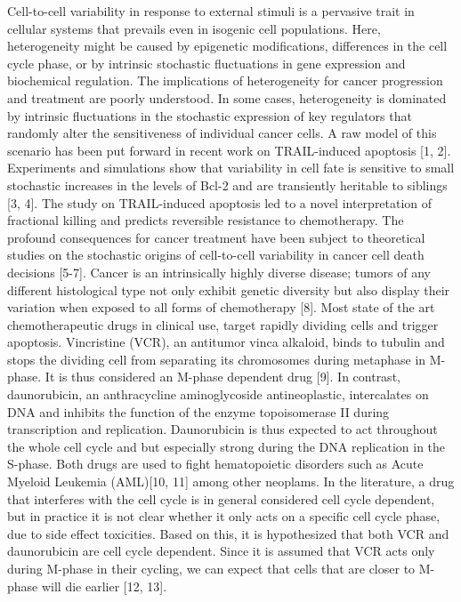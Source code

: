 \documentclass[pdftex,12pt,a4paper]{report}
\begin{document}
Cell-to-cell variability in response to external stimuli is a pervasive trait in cellular systems that prevails even in isogenic cell populations. Here, heterogeneity might be caused by epigenetic modifications, differences in the cell cycle phase, or by intrinsic stochastic fluctuations in gene expression and biochemical regulation. The implications of heterogeneity for cancer progression and treatment are poorly understood. In some cases, heterogeneity is dominated by intrinsic fluctuations in the stochastic expression of key regulators that randomly alter the sensitiveness of individual cancer cells. A raw model of this scenario has been put forward in recent work on TRAIL-induced apoptosis [1, 2]. Experiments and simulations show that variability in cell fate is sensitive to small stochastic increases in the levels of Bcl-2 and are transiently heritable to siblings [3, 4]. The study on TRAIL-induced apoptosis led to a novel interpretation of fractional killing and predicts reversible resistance to chemotherapy. The profound consequences for cancer treatment have been subject to theoretical studies on the stochastic origins of cell-to-cell variability in cancer cell death decisions [5-7]. 
Cancer is an intrinsically highly diverse disease; tumors of any different histological type not only exhibit genetic diversity but also display their variation when exposed to all forms of chemotherapy [8]. Most state of the art chemotherapeutic drugs in clinical use, target rapidly dividing cells and trigger apoptosis. Vincristine (VCR), an antitumor vinca alkaloid, binds to tubulin and stops the dividing cell from separating its chromosomes during metaphase in M-phase. It is thus considered an M-phase dependent drug [9]. In contrast, daunorubicin, an anthracycline aminoglycoside antineoplastic, intercalates on DNA and inhibits the function of the enzyme topoisomerase II during transcription and replication. Daunorubicin is thus expected to act throughout the whole cell cycle and but especially strong during the DNA replication in the S-phase. Both drugs are used to fight hematopoietic disorders such as Acute Myeloid Leukemia (AML)[10, 11] among other neoplams. In the literature, a drug that interferes with the cell cycle is in general considered cell cycle dependent, but in practice it is not clear whether it only acts on a specific cell cycle phase, due to side effect toxicities. Based on this, it is hypothesized that both VCR and daunorubicin are cell cycle dependent. Since it is assumed that VCR acts only during M-phase in their cycling, we can expect that cells that are closer to M-phase will die earlier [12, 13].  
\end{document}
